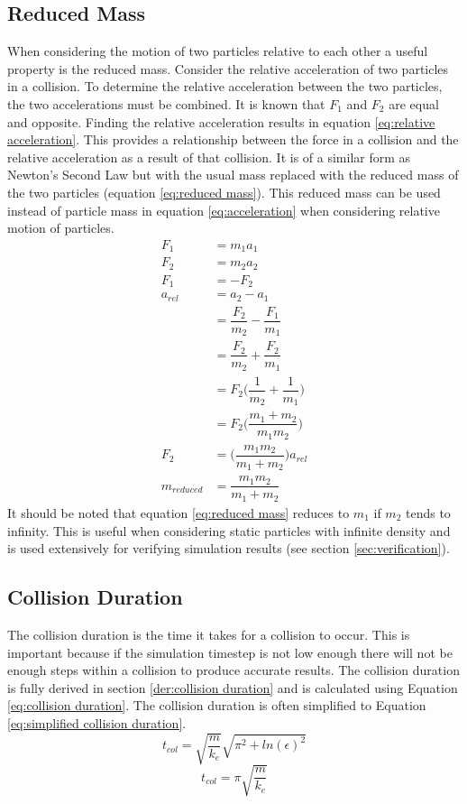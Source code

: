 \documentclass[10pt,a4paper,titlepage]{report}
\begin{document}
\subsection{Reduced Mass}
When considering the motion of two particles relative to each other a useful property is the reduced mass. Consider the relative acceleration of two particles in a collision. To determine the relative acceleration between the two particles, the two accelerations must be combined. It is known that $F_1$ and $F_2$ are equal and opposite. Finding the relative acceleration results in equation \ref{eq:relative acceleration}. This provides a relationship between the force in a collision and the relative acceleration as a result of that collision. It is of a similar form as Newton's Second Law but with the usual mass replaced with the reduced mass of the two particles (equation \ref{eq:reduced mass}). This reduced mass can be used instead of particle mass in equation \ref{eq:acceleration} when considering relative motion of particles.
\begin{align}
F_1 &= m_1 a_1 \nonumber
\\F_2 &= m_2 a_2 \nonumber
\\F_1 &= -F_2 \nonumber
\\a_{rel} &= a_2 - a_1 \nonumber
\\&= \dfrac{F_2}{m_2} - \dfrac{F_1}{m_1} \nonumber
\\&= \dfrac{F_2}{m_2} + \dfrac{F_2}{m_1} \nonumber
\\&= F_2 \Big(\dfrac{1}{m_2} + \dfrac{1}{m_1}\Big) \nonumber
\\&= F_2 \Big(\dfrac{m_1 + m_2}{m_1 m_2}\Big) \nonumber
\\F_2 &= \Big(\dfrac{m_1 m_2}{m_1 + m_2}\Big) a_{rel} \label{eq:relative acceleration}
\\m_{reduced} &= \dfrac{m_1 m_2}{m_1 + m_2} \label{eq:reduced mass}
\end{align}
It should be noted that equation \ref{eq:reduced mass} reduces to $m_1$ if $m_2$ tends to infinity. This is useful when considering static particles with infinite density and is used extensively for verifying simulation results (see section \ref{sec:verification}).
\subsection{Collision Duration}
\label{sec:collision duration}
The collision duration is the time it takes for a collision to occur. This is important because if the simulation timestep is not low enough there will not be enough steps within a collision to produce accurate results. The collision duration is fully derived in section \ref{der:collision duration} and is calculated using Equation \ref{eq:collision duration}. The collision duration is often simplified to Equation \ref{eq:simplified collision duration}.
\begin{equation}
t_{col} = \sqrt{\dfrac{m}{k_e}}\sqrt{\pi^2 + ln(\epsilon)^2}
\label{eq:collision duration}
\end{equation}
\begin{equation}
t_{col} = \pi \sqrt{\dfrac{m}{k_e}}
\label{eq:simplified collision duration}
\end{equation}
\end{document}
